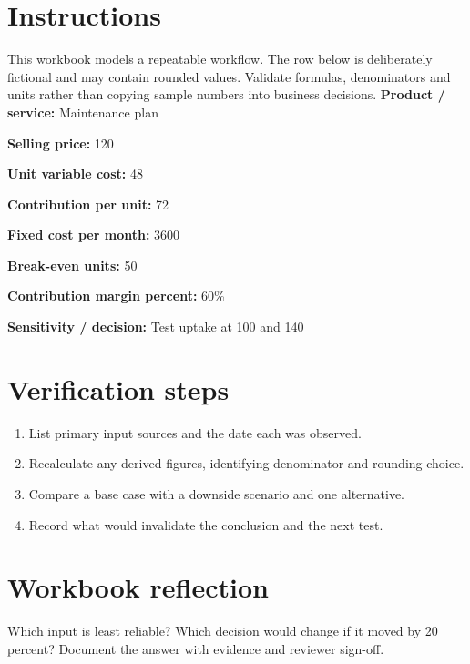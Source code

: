 \documentclass[11pt]{article}
\begin{document}
\SuiteOpen
\section{Instructions}
This workbook models a repeatable workflow. The row below is deliberately fictional and may contain rounded values. Validate formulas, denominators and units rather than copying sample numbers into business decisions.
\noindent\textbf{Product / service:} Maintenance plan\par\medskip
\noindent\textbf{Selling price:} 120\par\medskip
\noindent\textbf{Unit variable cost:} 48\par\medskip
\noindent\textbf{Contribution per unit:} 72\par\medskip
\noindent\textbf{Fixed cost per month:} 3600\par\medskip
\noindent\textbf{Break-even units:} 50\par\medskip
\noindent\textbf{Contribution margin percent:} 60\%\par\medskip
\noindent\textbf{Sensitivity / decision:} Test uptake at 100 and 140\par\medskip
\section{Verification steps}
\begin{enumerate}[leftmargin=*,itemsep=5pt]
\item List primary input sources and the date each was observed.
\item Recalculate any derived figures, identifying denominator and rounding choice.
\item Compare a base case with a downside scenario and one alternative.
\item Record what would invalidate the conclusion and the next test.
\end{enumerate}

\section{Workbook reflection}
Which input is least reliable? Which decision would change if it moved by 20 percent? Document the answer with evidence and reviewer sign-off.
\end{document}
